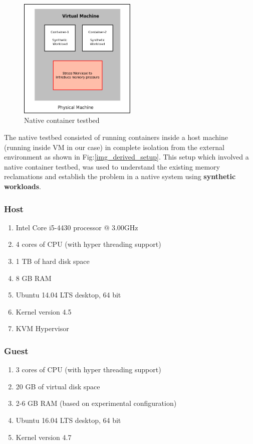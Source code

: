       \begin{figure}
	\centering
	\includegraphics[width=0.5\textwidth]{images/native_setup.png}
	\caption{Native container testbed}
	\label{img_native_setup}
      \end{figure}
      
       The native testbed consisted of running containers inside a host machine (running inside VM in our case) in complete isolation from 
the external environment as shown in Fig:\ref{img_derived_setup}. This setup which involved a native container testbed, was used to 
understand the existing memory reclamations and establish the problem in a native system using \textbf{synthetic workloads}.
	
      \subsubsection{Host}
	
	\begin{enumerate}
	  \item Intel Core i5-4430 processor @ 3.00GHz
	  \item 4 cores of CPU (with hyper threading support)
	  \item 1 TB of hard disk space
	  \item 8 GB RAM
	  \item Ubuntu 14.04 LTS desktop, 64 bit 
	  \item Kernel version 4.5
	  \item KVM Hypervisor
	\end{enumerate}
      
      \subsubsection{Guest}
	
	\begin{enumerate}
	  \item 3 cores of CPU (with hyper threading support)
	  \item 20 GB of virtual disk space
	  \item 2-6 GB RAM (based on experimental configuration)
	  \item Ubuntu 16.04 LTS desktop, 64 bit
	  \item Kernel version 4.7
	\end{enumerate}
	
